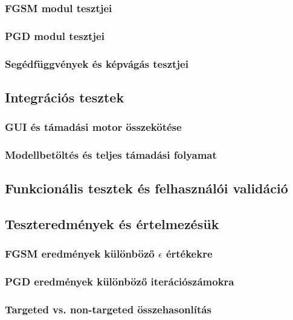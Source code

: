 \documentclass[12pt,a4paper]{article}
\begin{document}
\subsubsection{FGSM modul tesztjei}

\subsubsection{PGD modul tesztjei}

\subsubsection{Segédfüggvények és képvágás tesztjei}

\subsection{Integrációs tesztek}

\subsubsection{GUI és támadási motor összekötése}

\subsubsection{Modellbetöltés és teljes támadási folyamat}

\subsection{Funkcionális tesztek és felhasználói validáció}

\subsection{Teszteredmények és értelmezésük}

\subsubsection{FGSM eredmények különböző $\epsilon$ értékekre}

\subsubsection{PGD eredmények különböző iterációszámokra}

\subsubsection{Targeted vs. non-targeted összehasonlítás}
\end{document}
